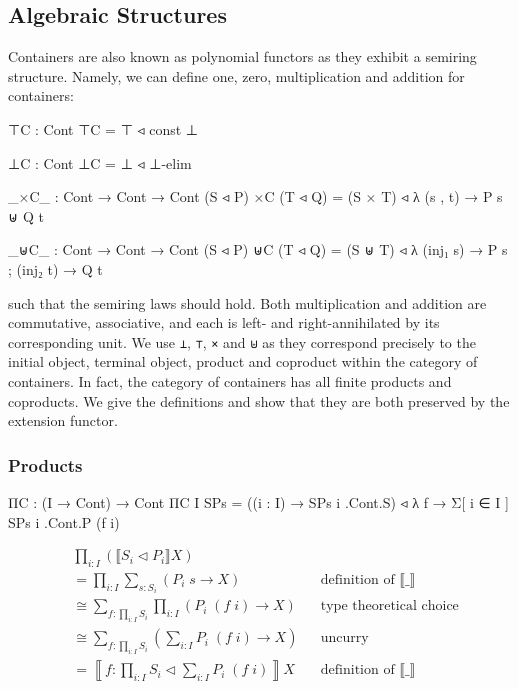\subsection{Algebraic Structures}

Containers are also known as polynomial functors as they exhibit a semiring structure. Namely, we can define one, zero, multiplication and addition for containers:

\begin{code}
⊤C : Cont
⊤C = ⊤ ◃ const ⊥

⊥C : Cont
⊥C = ⊥ ◃ ⊥-elim

_×C_ : Cont → Cont → Cont
(S ◃ P) ×C (T ◃ Q) = (S × T) ◃ λ (s , t) → P s ⊎ Q t

_⊎C_ : Cont → Cont → Cont
(S ◃ P) ⊎C (T ◃ Q) = (S ⊎ T) ◃ λ{ (inj₁ s) → P s ; (inj₂ t) → Q t }
\end{code}

such that the semiring laws should hold. Both multiplication and addition are commutative, associative, and each is left- and right-annihilated by its corresponding unit. We use \texttt{⊥}, \texttt{⊤}, \texttt{×} and \texttt{⊎} as they correspond precisely to the initial object, terminal object, product and coproduct within the category of containers. In fact, the category of containers has all finite products and coproducts. We give the definitions and show that they are both preserved by the extension functor.

\subsubsection*{Products}

\begin{code}
ΠC : (I → Cont) → Cont
ΠC {I} SPs = ((i : I) → SPs i .Cont.S) ◃ λ f → Σ[ i ∈ I ] SPs i .Cont.P (f i)
\end{code}

\begin{align*}
& \prod_{i : I} (\llbracket S_i \triangleleft P_i \rrbracket X) \\
&= \prod_{i : I} \sum_{s : S_i} (P_i \; s \rightarrow X) && \text{definition of $\llbracket \_ \rrbracket$} \\
&\cong \sum_{f : \prod_{i : I} S_i} \prod_{i : I} (P_i \; (f \; i) \rightarrow X) && \text{type theoretical choice} \\
&\cong \sum_{f : \prod_{i : I} S_i} \left( \sum_{i : I} P_i \; (f \; i) \rightarrow X \right) && \text{uncurry} \\
&= \left\llbracket f : \prod_{i : I} S_i \triangleleft \sum_{i : I} P_i \; (f \; i) \right\rrbracket X && \text{definition of $\llbracket \_ \rrbracket$} \\
\end{align*}

